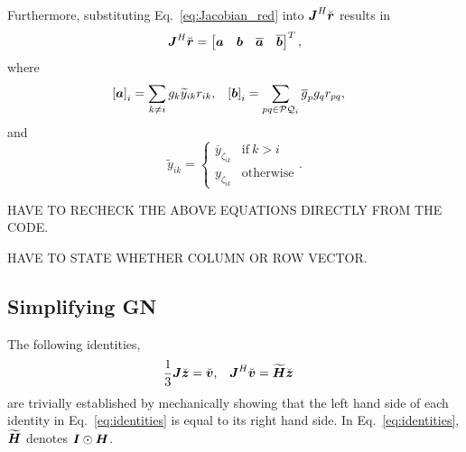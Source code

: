 \documentclass[useAMS,usenatbib]{mn2e}
\newcommand{\bz}{\bmath{z}}
\newcommand{\br}{\bmath{r}}
\newcommand{\bv}{\bmath{v}}
\newcommand{\bJ}{\bmath{J}}
\newcommand{\bH}{\bmath{H}}
\newcommand{\bI}{\bmath{I}}
\newcommand{\ba}{\bmath{a}}
\newcommand{\bb}{\bmath{b}}
\newcommand{\conj}[1]{\overline{#1}}
\begin{document}
Furthermore, substituting Eq.~\eqref{eq:Jacobian_red} into $\bJ^H\breve{\br}$ results in
\begin{equation}
\bJ^H\breve{\br} = \begin{bmatrix}
                   \ba & \bb & \conj{\ba} & \conj{\bb}\\
                   \end{bmatrix}^T,
\end{equation}
where
\begin{align}
\label{eq:ab}
\left [ \ba \right ]_i &= \sum_{k\neq i} g_k \widetilde{y}_{ik}r_{ik},  & \left [ \bb \right ]_i &= \sum_{pq\in\mathcal{PQ}_i}\conj{g}_p g_q r_{pq},
\end{align}
and
\begin{equation}
\widetilde{y}_{ik} = 
\begin{cases}
\conj{y}_{\zeta_{ik}} & \textrm{if}~k > i\\
y_{\zeta_{ik}} & \textrm{otherwise}
\end{cases}.
\end{equation}

HAVE TO RECHECK THE ABOVE EQUATIONS DIRECTLY FROM THE CODE.

HAVE TO STATE WHETHER COLUMN OR ROW VECTOR.





\subsection{Simplifying GN}

The following identities,
\begin{align}
\label{eq:identities}
\frac{1}{3}\bJ\breve{\bz} &= \breve{\bv}, & \bJ^H\breve{\bv} &= \widetilde{\bH}\breve{\bz} 
\end{align}
are trivially established by mechanically showing that the left hand side of each identity in Eq.~\eqref{eq:identities} is equal to its right hand side.
In Eq.~\eqref{eq:identities}, $\widetilde{\bH}$ denotes $\bI\odot\bH$.
\end{document}
